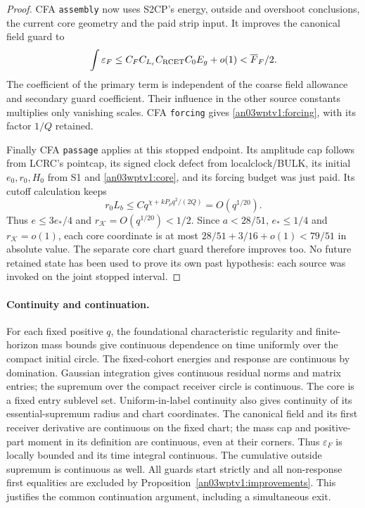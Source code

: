 \documentclass[11pt]{article}
\theoremstyle{remark}\newtheorem{remark}[theorem]{Remark}
\newcommand{\KK}{\mathcal K}
\newcommand{\eps}{\varepsilon}
\begin{document}
\begin{proof}
CFA \texttt{assembly} now uses S2CP's energy, outside and overshoot
conclusions, the current core geometry and the paid strip input.
It improves the canonical field guard to
\[
 \int\eps_F\le C_FC_{L_c}C_{\rm RCET}C_0E_g+o(1)
       <\overline F_F/2.
\]
The coefficient of the primary term is
independent of the coarse field allowance and secondary guard
coefficient. Their influence in the other source constants
multiplies only vanishing scales. CFA \texttt{forcing} gives
\eqref{an03wptv1:forcing}, with its factor $1/Q$ retained.

Finally CFA \texttt{passage} applies at this stopped endpoint.
Its amplitude cap follows from LCRC's pointcap, its signed clock
defect from localclock/BULK, its initial $e_0,r_0,H_0$ from S1
and \eqref{an03wptv1:core}, and its forcing budget was just paid.
Its cutoff calculation keeps
\[
 r_0L_b\le Cq^{\chi+kP_\rho q^2/(2Q)}=O(q^{1/20}).
\]
Thus $e\le3e_*/4$ and $r_{\KK}=O(q^{1/20})<1/2$.
Since $a<28/51$, $e_*\le1/4$ and $r_{\KK}=o(1)$, each core
coordinate is at most $28/51+3/16+o(1)<79/51$ in absolute
value. The separate core chart guard therefore improves too.
No future retained state has been used to prove its own past
hypothesis: each source was invoked on the joint stopped interval.
\end{proof}

\paragraph{Continuity and continuation.}
For each fixed positive $q$, the foundational characteristic
regularity and finite-horizon mass bounds give continuous dependence
on time uniformly over the compact initial circle. The fixed-cohort
energies and response are continuous by domination. Gaussian
integration gives continuous residual norms and matrix entries;
the supremum over the compact receiver circle is continuous.
The core is a fixed entry sublevel set. Uniform-in-label continuity
also gives continuity of its essential-supremum radius and chart
coordinates. The canonical field and its first receiver derivative
are continuous on the fixed chart; the mass cap and positive-part
moment in its definition are continuous, even at their corners.
Thus $\eps_F$ is locally bounded and its time integral continuous.
The cumulative outside supremum is continuous as well. All guards
start strictly and all non-response first equalities are excluded
by Proposition~\ref{an03wptv1:improvements}. This justifies the
common continuation argument, including a simultaneous exit.
\end{document}
